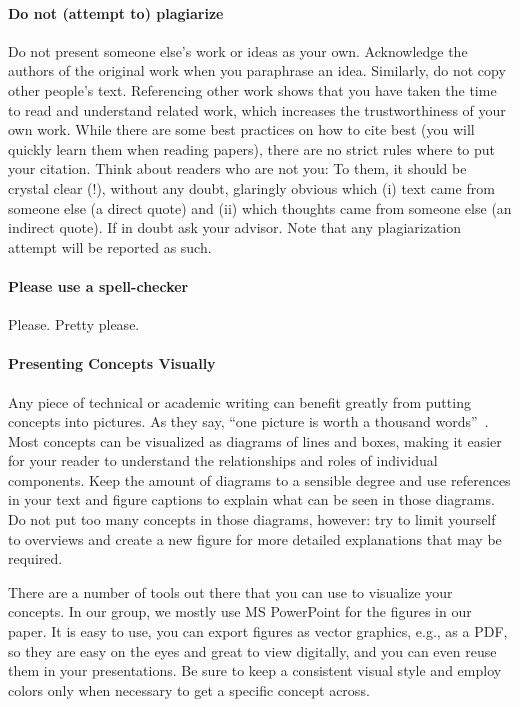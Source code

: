 \documentclass[a4paper]{article}
\begin{document}
\paragraph{Do not (attempt to) plagiarize}
\label{subsec:plags}
Do not present someone else's work or ideas as your own.
Acknowledge the authors of the original work when you paraphrase an idea.
Similarly, do not copy other people's text.
Referencing other work shows that you have taken the time to read and understand related work, which increases the trustworthiness of your own work.
While there are some best practices on how to cite best (you will quickly learn them when reading papers), there are no strict rules where to put your citation.
Think about readers who are not you: To them, it should be crystal clear (!), without any doubt, glaringly obvious which (i) text came from someone else (a direct quote) and (ii) which thoughts came from someone else (an indirect quote).
If in doubt ask your advisor.
Note that any plagiarization attempt will be reported as such.

\paragraph{Please use a spell-checker}
Please.
Pretty please.

\paragraph{Presenting Concepts Visually} \label{sec:diagrams}

Any piece of technical or academic writing can benefit greatly from putting concepts into pictures.
As they say, ``one picture is worth a thousand words''~\cite{thousandwords}.
Most concepts can be visualized as diagrams of lines and boxes, making it easier for your reader to understand the relationships and roles of individual components.
Keep the amount of diagrams to a sensible degree and use references in your text and figure captions to explain what can be seen in those diagrams.
Do not put too many concepts in those diagrams, however: try to limit yourself to overviews and create a new figure for more detailed explanations that may be required.

There are a number of tools out there that you can use to visualize your concepts.
In our group, we mostly use MS PowerPoint for the figures in our paper.
It is easy to use, you can export figures as vector graphics, e.g., as a PDF, so they are easy on the eyes and great to view digitally, and you can even reuse them in your presentations.
Be sure to keep a consistent visual style and employ colors only when necessary to get a specific concept across.
\end{document}
